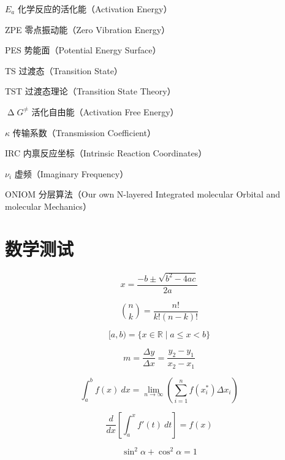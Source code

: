 \documentclass[report, twoside, UTF8, AutoFakeBold = 1, AutoFakeSlant, zihao = -4]{config}
\begin{document}
\begin{denotation}
  \item[$E_a$] 化学反应的活化能（Activation Energy）
  \item[ZPE] 零点振动能（Zero Vibration Energy）
  \item[PES] 势能面（Potential Energy Surface）
  \item[TS] 过渡态（Transition State）
  \item[TST] 过渡态理论（Transition State Theory）
  \item[$\upDelta G^\neq$] 活化自由能（Activation Free Energy）
  \item[$\kappa$] 传输系数（Transmission Coefficient）
  \item[IRC] 内禀反应坐标（Intrinsic Reaction Coordinates）
  \item[$\nu_i$] 虚频（Imaginary Frequency）
  \item[ONIOM] 分层算法（Our own N-layered Integrated molecular Orbital and molecular Mechanics）
\end{denotation}

\chapter{数学测试}

\[ x = \frac{-b \pm \sqrt{b^2 - 4ac}}{2a} \]

\[ \binom{n}{k} = \frac{n!}{k!(n-k)!} \]

\[ [a,b) = \{ x\in\mathbb{R} \mid a \le x < b \} \]

\[ m = \frac{\Delta y}{\Delta x} = \frac{y_2 - y_1}{x_2 - x_1} \]

\[ \int_a^b f(x)\ dx = \lim_{n\to\infty} \left( \sum_{i=1}^n f(x_i^*) \Delta x_i \right) \]

\[ \frac{d}{dx} \left[ \int_a^x f'(t)\ dt \right] = f(x) \]

\[ \sin^2\alpha + \cos^2\alpha = 1 \]
\end{document}
